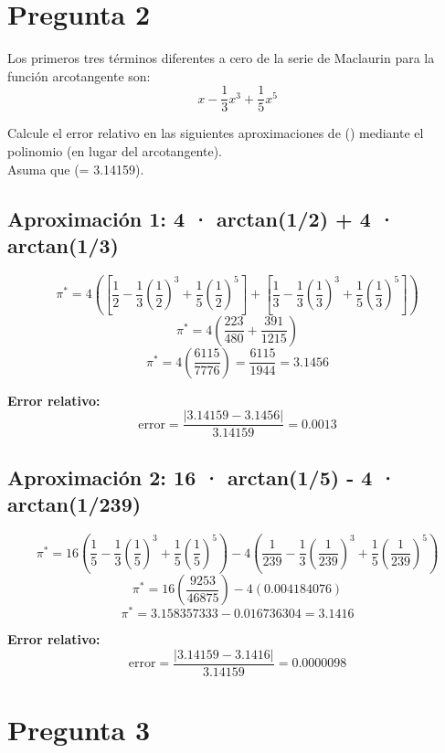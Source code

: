\documentclass[
  letterpaper,
  DIV=11,
  numbers=noendperiod]{scrartcl}
\begin{document}
\section{Pregunta 2}\label{pregunta-2}

Los primeros tres términos diferentes a cero de la serie de Maclaurin
para la función arcotangente son: \[
x - \frac{1}{3}x^3 + \frac{1}{5}x^5
\]

Calcule el error relativo en las siguientes aproximaciones de (\pi)
mediante el polinomio (en lugar del arcotangente).\\
Asuma que (\pi = 3.14159).

\subsection{Aproximación 1: 4 · arctan(1/2) + 4 ·
arctan(1/3)}\label{aproximaciuxf3n-1-4-arctan12-4-arctan13}

\[
\pi^* = 4\left(\left[\frac{1}{2} - \frac{1}{3}\left(\frac{1}{2}\right)^3 + \frac{1}{5}\left(\frac{1}{2}\right)^5\right] + \left[\frac{1}{3} - \frac{1}{3}\left(\frac{1}{3}\right)^3 + \frac{1}{5}\left(\frac{1}{3}\right)^5\right]\right)
\] \[
\pi^* = 4\left(\frac{223}{480} + \frac{391}{1215}\right)
\] \[
\pi^* = 4\left(\frac{6115}{7776}\right) = \frac{6115}{1944} = 3.1456
\]

\textbf{Error relativo:} \[
\text{error} = \frac{|3.14159 - 3.1456|}{3.14159} = 0.0013
\]

\subsection{Aproximación 2: 16 · arctan(1/5) - 4 ·
arctan(1/239)}\label{aproximaciuxf3n-2-16-arctan15---4-arctan1239}

\[
\pi^* = 16\left(\frac{1}{5} - \frac{1}{3}\left(\frac{1}{5}\right)^3 + \frac{1}{5}\left(\frac{1}{5}\right)^5\right) - 4\left(\frac{1}{239} - \frac{1}{3}\left(\frac{1}{239}\right)^3 + \frac{1}{5}\left(\frac{1}{239}\right)^5\right)
\] \[
\pi^* = 16\left(\frac{9253}{46875}\right) - 4(0.004184076)
\] \[
\pi^* = 3.158357333 - 0.016736304 = 3.1416
\]

\textbf{Error relativo:} \[
\text{error} = \frac{|3.14159 - 3.1416|}{3.14159} = 0.0000098
\]

\section{Pregunta 3}\label{pregunta-3}
\end{document}
